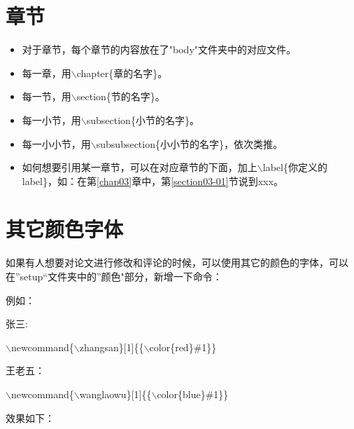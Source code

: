 \section{章节}
\begin{itemize}
    \item 对于章节，每个章节的内容放在了"body"文件夹中的对应文件。
    \item 每一章，用$\backslash$chapter\{章的名字\}。
    \item 每一节，用$\backslash$section\{节的名字\}。
    \item 每一小节，用$\backslash$subsection\{小节的名字\}。
    \item 每一小小节，用$\backslash$subsubsection\{小小节的名字\}，依次类推。
    \item 如何想要引用某一章节，可以在对应章节的下面，加上$\backslash$label\{你定义的label\}，如：在第\ref{chap03}章中，第\ref{section03-01}节说到xxx。
\end{itemize}

\section{其它颜色字体}
如果有人想要对论文进行修改和评论的时候，可以使用其它的颜色的字体，可以在”setup“文件夹中的”颜色"部分，新增一下命令：

例如：

张三:

$\backslash$newcommand\{$\backslash$zhangsan\}[1]\{\{$\backslash$color\{red\}\#1\}\}

王老五：

$\backslash$newcommand\{$\backslash$wanglaowu\}[1]\{\{$\backslash$color\{blue\}\#1\}\}

效果如下：





